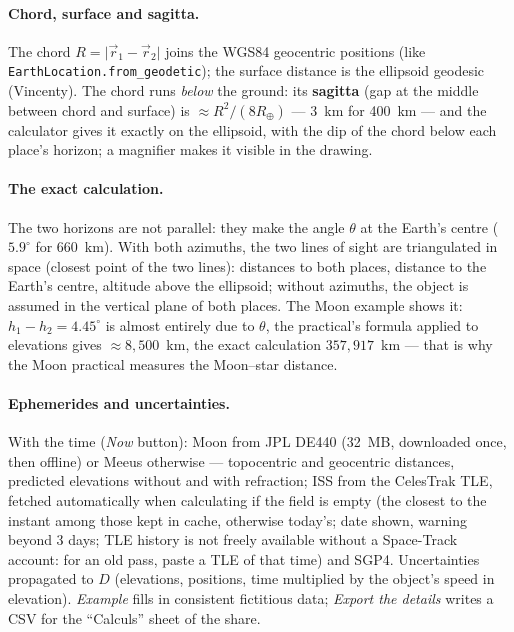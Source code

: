 \paragraph{Chord, surface and sagitta.} The chord $R = \lvert\vec r_1 - \vec r_2\rvert$ joins the WGS84 geocentric
positions (like \texttt{EarthLocation.from\_geodetic}); the surface distance is the ellipsoid geodesic (Vincenty). The
chord runs \emph{below} the ground: its \textbf{sagitta} (gap at the middle between chord and surface) is
$\approx R^2/(8R_\oplus)$ — 3~km for 400~km — and the calculator gives it exactly on the ellipsoid, with the dip of
the chord below each place's horizon; a magnifier makes it visible in the drawing.

\paragraph{The exact calculation.} The two horizons are not parallel: they make the angle $\theta$ at the Earth's
centre ($5.9^\circ$ for 660~km). With both azimuths, the two lines of sight are triangulated in space (closest point of
the two lines): distances to both places, distance to the Earth's centre, altitude above the ellipsoid; without
azimuths, the object is assumed in the vertical plane of both places. The Moon example shows it:
$h_1 - h_2 = 4.45^\circ$ is almost entirely due to $\theta$, the practical's formula applied to elevations gives
$\approx 8{,}500$~km, the exact calculation $357{,}917$~km — that is why the Moon practical measures the Moon–star
distance.

\paragraph{Ephemerides and uncertainties.} With the time (\emph{Now} button): Moon from JPL DE440 (32~MB, downloaded
once, then offline) or Meeus otherwise — topocentric and geocentric distances, predicted elevations without and with
refraction; ISS from the CelesTrak TLE, fetched automatically when calculating if the field is empty (the closest to
the instant among those kept in cache, otherwise today's; date shown, warning
beyond 3 days; TLE history is not freely available without a Space-Track account: for an old pass, paste a TLE of
that time) and SGP4. Uncertainties propagated to $D$ (elevations, positions, time multiplied by the object's speed
in elevation). \emph{Example} fills in consistent fictitious data; \emph{Export the details} writes a CSV for the
“Calculs” sheet of the share.

